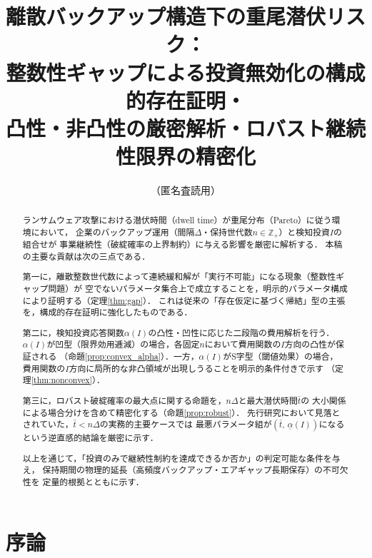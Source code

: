 \documentclass[12pt,a4paper]{article}
\theoremstyle{plain}
\theoremstyle{definition}
\theoremstyle{remark}
\newcommand{\Z}{\mathbb{Z}}
\begin{document}

\title{%
離散バックアップ構造下の重尾潜伏リスク：\\
整数性ギャップによる投資無効化の構成的存在証明・\\
凸性・非凸性の厳密解析・ロバスト継続性限界の精密化}
\author{（匿名査読用）}
\date{}
\maketitle

\begin{abstract}
ランサムウェア攻撃における潜伏時間（dwell time）が重尾分布（Pareto）に従う環境において，
企業のバックアップ運用（間隔$\Delta$・保持世代数$n\in\Z_+$）と検知投資$I$の組合せが
事業継続性（破綻確率の上界制約）に与える影響を厳密に解析する．
本稿の主要な貢献は次の三点である．

第一に，離散整数世代数によって連続緩和解が「実行不可能」になる現象（整数性ギャップ問題）が
空でないパラメータ集合上で成立することを，明示的パラメータ構成により証明する（定理\ref{thm:gap}）．
これは従来の「存在仮定に基づく帰結」型の主張を，構成的存在証明に強化したものである．

第二に，検知投資応答関数$\alpha(I)$の凸性・凹性に応じた二段階の費用解析を行う．
$\alpha(I)$が凹型（限界効用逓減）の場合，各固定$n$において費用関数の$I$方向の凸性が保証される
（命題\ref{prop:convex_alpha}）．一方，$\alpha(I)$がS字型（閾値効果）の場合，
費用関数の$I$方向に局所的な非凸領域が出現しうることを明示的条件付きで示す
（定理\ref{thm:nonconvex}）．

第三に，ロバスト破綻確率の最大点に関する命題を，$n\Delta$と最大潜伏時間$\bar{t}$の
大小関係による場合分けを含めて精密化する（命題\ref{prop:robust}）．
先行研究において見落とされていた，$\bar{t} < n\Delta$の実務的主要ケースでは
最悪パラメータ組が$(\bar{t},\,\underline{\alpha}(I))$になるという逆直感的結論を厳密に示す．

以上を通じて，「投資のみで継続性制約を達成できるか否か」の判定可能な条件を与え，
保持期間の物理的延長（高頻度バックアップ・エアギャップ長期保存）の不可欠性を
定量的根拠とともに示す．
\end{abstract}

\section{序論}
\label{sec:intro}
\end{document}
